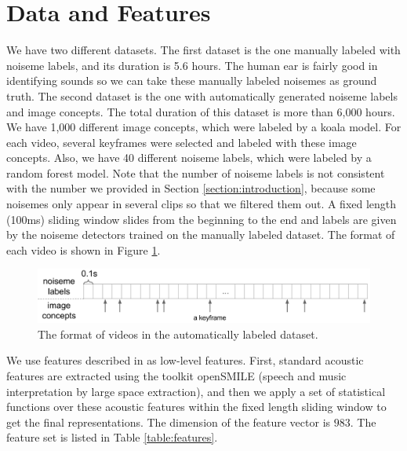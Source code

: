 \documentclass[conference, 11pt, onecolumn]{IEEEtran}
\begin{document}
\section{Data and Features}
\label{section:data}
We have two different datasets. The first dataset is the one manually labeled with noiseme labels, and its duration is 5.6 hours. The human ear is fairly good in identifying sounds so we can take these manually labeled noisemes as ground truth. The second dataset is the one with automatically generated noiseme labels and image concepts. The total duration of this dataset is more than 6,000 hours. We have 1,000 different image concepts, which were labeled by a koala model. For each video, several keyframes were selected and labeled with these image concepts. Also, we have 40 different noiseme labels, which were labeled by a random forest model. Note that the number of noiseme labels is not consistent with the number we provided in Section \ref{section:introduction}, because some noisemes only appear in several clips so that we filtered them out. A fixed length (100ms) sliding window slides from the beginning to the end and labels are given by the noiseme detectors trained on the manually labeled dataset. The format of each video is shown in Figure \ref{fig:format}.

\begin{figure}[h!]
\centering
\includegraphics[scale=0.45]{figure/format.png}
\caption{The format of videos in the automatically labeled dataset.}
\label{fig:format}
\end{figure}

We use features described in \cite{wang2014exploring} as low-level features. First, standard acoustic features are extracted using the toolkit openSMILE \cite{eyben2013recent} (speech and music interpretation by large space extraction), and then we apply a set of statistical functions over these acoustic features within the fixed length sliding window to get the final representations. The dimension of the feature vector is $983$. The feature set is listed in Table \ref{table:features}.
\end{document}

